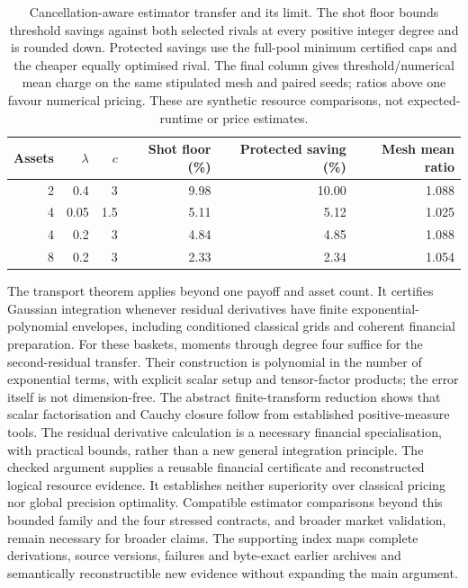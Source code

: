 \documentclass[11pt]{article}
\begin{document}
\begin{table}[ht]
\centering\small
\begin{tabular}{rrrrrr}
\toprule
Assets&$\lambda$&$c$&Shot floor (\%)&Protected saving (\%)&Mesh mean ratio\\
\midrule
2&0.4&3&9.98&10.00&1.088\\
4&0.05&1.5&5.11&5.12&1.025\\
4&0.2&3&4.84&4.85&1.088\\
8&0.2&3&2.33&2.34&1.054\\
\bottomrule
\end{tabular}
\caption{Cancellation-aware estimator transfer and its limit. The shot floor
bounds threshold savings against both selected rivals at every positive
integer degree and is rounded down. Protected savings use the full-pool
minimum certified caps and the cheaper equally optimised rival. The final
column gives threshold/numerical mean charge on the same stipulated mesh
and paired seeds; ratios above one favour numerical pricing. These are
synthetic resource comparisons, not expected-runtime or price estimates.}
\label{tab:matched-estimator-transfer}
\end{table}


The transport theorem applies beyond one payoff and asset count. It
certifies Gaussian integration whenever residual derivatives have finite
exponential-polynomial envelopes, including conditioned classical grids
and coherent financial preparation. For these baskets, moments through
degree four suffice for the second-residual transfer. Their construction
is polynomial in the number of exponential terms, with explicit scalar
setup and tensor-factor products; the error itself is not dimension-free.
The abstract finite-transform reduction shows that scalar factorisation
and Cauchy closure follow from established positive-measure tools. The
residual derivative calculation is a necessary financial specialisation,
with practical bounds, rather than a new general integration principle.
The checked argument supplies a reusable financial certificate and
reconstructed logical resource evidence. It establishes neither
superiority over classical pricing nor global precision optimality.
Compatible estimator comparisons beyond this bounded family and the four
stressed contracts, and broader market validation, remain necessary for
broader claims. The
supporting index maps complete derivations, source versions, failures and
byte-exact earlier archives and semantically reconstructible new evidence
without expanding the main argument.
\end{document}
